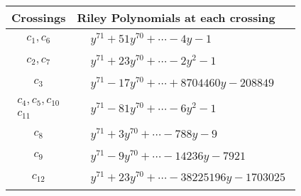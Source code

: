 \documentclass[1p]{elsarticle_modified}
\theoremstyle{definition}
\begin{document}
\begin{tabular}{m{50pt}|m{274pt}}
Crossings & \hspace{64pt}Riley Polynomials at each crossing \\
\hline $$\begin{aligned}c_{1},c_{6}\end{aligned}$$&$\begin{aligned}
&y^{71}+51 y^{70}+\cdots-4 y-1
\end{aligned}$\\
\hline $$\begin{aligned}c_{2},c_{7}\end{aligned}$$&$\begin{aligned}
&y^{71}+23 y^{70}+\cdots-2 y^2-1
\end{aligned}$\\
\hline $$\begin{aligned}c_{3}\end{aligned}$$&$\begin{aligned}
&y^{71}-17 y^{70}+\cdots+8704460 y-208849
\end{aligned}$\\
\hline $$\begin{aligned}c_{4},c_{5},c_{10}\\c_{11}\end{aligned}$$&$\begin{aligned}
&y^{71}-81 y^{70}+\cdots-6 y^2-1
\end{aligned}$\\
\hline $$\begin{aligned}c_{8}\end{aligned}$$&$\begin{aligned}
&y^{71}+3 y^{70}+\cdots-788 y-9
\end{aligned}$\\
\hline $$\begin{aligned}c_{9}\end{aligned}$$&$\begin{aligned}
&y^{71}-9 y^{70}+\cdots-14236 y-7921
\end{aligned}$\\
\hline $$\begin{aligned}c_{12}\end{aligned}$$&$\begin{aligned}
&y^{71}+23 y^{70}+\cdots-38225196 y-1703025
\end{aligned}$\\
\hline
\end{tabular}
\vskip 2pc
\end{document}

